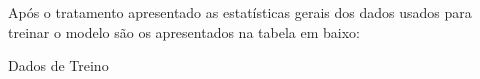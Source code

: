 Após o tratamento apresentado as estatísticas gerais dos dados usados para treinar o modelo são os apresentados na tabela em baixo: \par

\begin{table}[H]
    \centering
    \caption{Dados de Treino}    
    \resizebox{\linewidth}{!}{}
    \end{table}


\thispagestyle{plain}
 \label{se:val_data}
